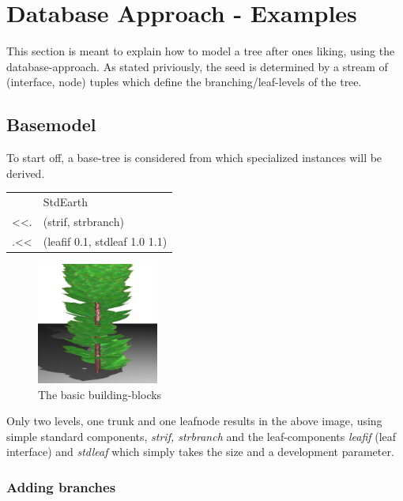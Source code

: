 \section{Database Approach - Examples}

    This section is meant to explain how to model a tree after ones liking,
    using the database-approach. As stated priviously, the seed is determined by
    a stream of (interface, node) tuples which define the branching/leaf-levels
    of the tree.

\subsection{Basemodel}

    To start off, a base-tree is considered from which specialized instances
    will be derived. \\
                                             
\begin{tabular}{ll}
  &StdEarth\\
  <<.&(strif, strbranch)\\
  .<<&(leafif 0.1, stdleaf 1.0 1.1)\\
\end{tabular}
 
\begin{figure}[htb]
        \centering
        \includegraphics[height=4cm,width=4cm, angle=0]{images/dbex0}
        \caption{The basic building-blocks}
        \label{fig:graph2}
\end{figure}

    Only two levels, one trunk and one leafnode results in the above image,
    using simple standard components, \emph{strif, strbranch} and the
    leaf-components \emph{leafif} (leaf interface) and \emph{stdleaf} which
    simply takes the size and a development parameter.

\subsubsection{Adding branches}

